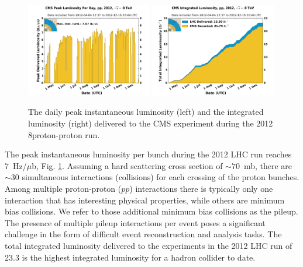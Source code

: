 \begin{figure}[htbp]
\centering
\includegraphics[width=0.49\textwidth]{plots/intro/peak_lumi.pdf}
\includegraphics[width=0.49\textwidth]{plots/intro/int_lumi.pdf}
\caption{The daily peak instantaneous luminosity (left) and the integrated luminosity (right)
 delivered to the CMS experiment during the 2012 8\TeV proton-proton run.\label{fig:lumi}}
\end{figure}

The peak instantaneous luminosity per bunch during the 2012 LHC run 
 reaches 7~Hz/$\mu$b, Fig. \ref{fig:lumi}. 
Assuming a hard scattering cross section of $\sim70$~mb, there are $\sim$30 simultaneous 
interactions (collisions) for each 
crossing of the proton bunches. Among multiple proton-proton ($pp$) 
interactions there is typically only one interaction
that has interesting physical properties, while others are minimum bias collisions.
We refer to those additional minimum bias collisions as the pileup.
The presence of multiple pileup interactions per event
 poses a significant challenge in the form of difficult event reconstruction and analysis tasks.
 The total integrated luminosity 
delivered to the experiments in the 2012 LHC run of 23.3 \fbinv 
is the highest integrated luminosity for a hadron collider 
to date.
